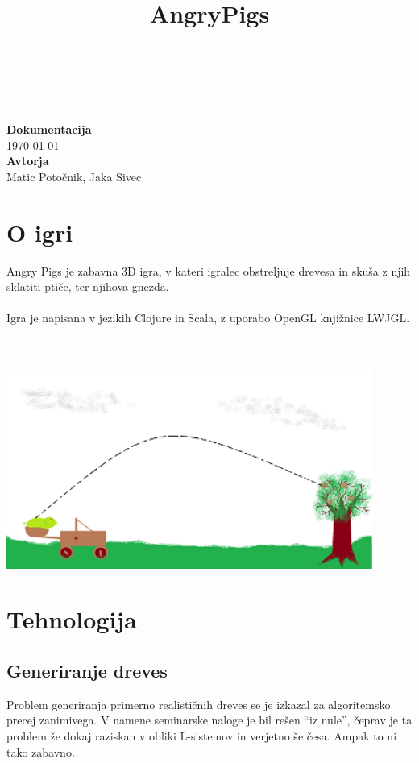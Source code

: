 \documentclass[10pt,a4paper,oneside]{book}
\title{AngryPigs}
\newcommand\br{%
 \ \\ \ \\%
}
\begin{document}
\begin{titlepage}
\begin{center}
\ \\[3.5cm]
{}\\[-2.8cm]
{}\\[3.9cm]
{\Huge\bf Dokumentacija}\\[0.35cm]
{\huge\today}\ \\[4.5cm]
{\Huge {\bf Avtorja}}\\[0.35cm]
{\huge Matic Potočnik, Jaka Sivec}
\vfill
\end{center}
\end{titlepage}
\chapter{O igri}
Angry Pigs je zabavna 3D igra, v kateri igralec obstreljuje drevesa in skuša z njih sklatiti ptiče, ter njihova gnezda.
\br
Igra je napisana v jezikih Clojure in Scala, z uporabo OpenGL knjižnice LWJGL.
\br
\begin{center}
\includegraphics[width=12cm]{conceptsmall}
\end{center}

\chapter{Tehnologija}

\section{Generiranje dreves}
Problem generiranja primerno realističnih dreves se je izkazal za
algoritemsko precej zanimivega. V namene seminarske naloge je bil
rešen ``iz nule'', čeprav je ta problem že dokaj raziskan v obliki
L-sistemov in verjetno še česa. Ampak to ni tako zabavno.
\end{document}

